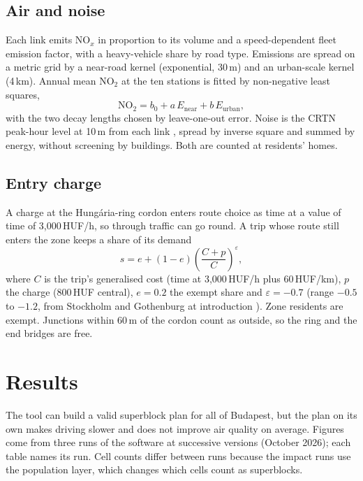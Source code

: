 \documentclass[11pt,a4paper]{article}
\begin{document}
\subsection{Air and noise}
Each link emits NO$_x$ in proportion to its volume and a speed-dependent fleet emission factor, with a heavy-vehicle share by road type. Emissions are spread on a metric grid by a near-road kernel (exponential, 30\,m) and an urban-scale kernel (4\,km). Annual mean NO$_2$ at the ten stations is fitted by non-negative least squares,
\begin{equation}
  \mathrm{NO_2} = b_0 + a\,E_{\text{near}} + b\,E_{\text{urban}},
\end{equation}
with the two decay lengths chosen by leave-one-out error. Noise is the CRTN peak-hour level at 10\,m from each link \citep{crtn1988}, spread by inverse square and summed by energy, without screening by buildings. Both are counted at residents' homes.

\subsection{Entry charge}
A charge at the Hungária-ring cordon enters route choice as time at a value of time of 3,000\,HUF/h, so through traffic can go round. A trip whose route still enters the zone keeps a share of its demand
\begin{equation}
  s = e + (1-e)\left(\frac{C+p}{C}\right)^{\varepsilon},
\end{equation}
where $C$ is the trip's generalised cost (time at 3,000\,HUF/h plus 60\,HUF/km), $p$ the charge (800\,HUF central), $e=0.2$ the exempt share and $\varepsilon=-0.7$ (range $-0.5$ to $-1.2$, from Stockholm and Gothenburg at introduction \citep{cts2012,itf}). Zone residents are exempt. Junctions within 60\,m of the cordon count as outside, so the ring and the end bridges are free.

\section{Results}\label{sec:results}

The tool can build a valid superblock plan for all of Budapest, but the plan on its own makes driving slower and does not improve air quality on average. Figures come from three runs of the software at successive versions (October 2026); each table names its run. Cell counts differ between runs because the impact runs use the population layer, which changes which cells count as superblocks.
\end{document}
